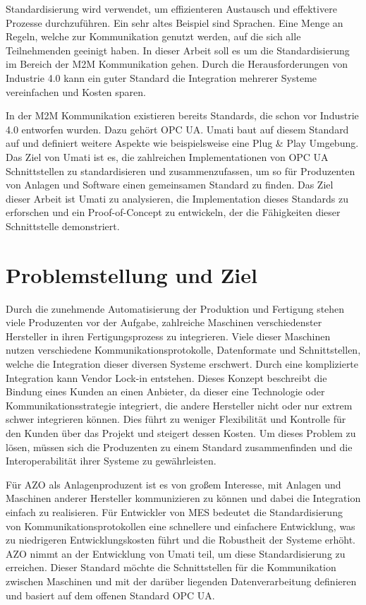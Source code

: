 \documentclass[a4paper, 12pt, oneside, toc=listofnumbered, bibliography=totoc]{scrbook}
\begin{document}
	Standardisierung wird verwendet, um effizienteren Austausch und effektivere Prozesse durchzuführen. Ein sehr altes Beispiel sind Sprachen. Eine Menge an Regeln, welche zur Kommunikation genutzt werden, auf die sich alle Teilnehmenden geeinigt haben. In dieser Arbeit soll es um die Standardisierung im Bereich der \ac{M2M} Kommunikation gehen. Durch die Herausforderungen von Industrie 4.0 kann ein guter Standard die Integration mehrerer Systeme vereinfachen und Kosten sparen.
	
	In der M2M Kommunikation existieren bereits Standards, die schon vor Industrie 4.0 entworfen wurden. Dazu gehört \ac{OPC UA}. \ac{Umati} baut auf diesem Standard auf und definiert weitere Aspekte wie beispielsweise eine Plug \& Play Umgebung. Das Ziel von \ac{Umati} ist es, die zahlreichen Implementationen von OPC UA Schnittstellen zu standardisieren und zusammenzufassen, um so für Produzenten von Anlagen und Software einen gemeinsamen Standard zu finden. Das Ziel dieser Arbeit ist \ac{Umati} zu analysieren, die Implementation dieses Standards zu erforschen und ein Proof-of-Concept zu entwickeln, der die Fähigkeiten dieser Schnittstelle demonstriert.
	
	\section{Problemstellung und Ziel}
	
	
	 Durch die zunehmende Automatisierung der Produktion und Fertigung stehen viele Produzenten vor der Aufgabe, zahlreiche Maschinen verschiedenster Hersteller in ihren Fertigungsprozess zu integrieren. Viele dieser Maschinen nutzen verschiedene Kommunikationsprotokolle, Datenformate und Schnittstellen, welche die Integration dieser diversen Systeme erschwert. Durch eine komplizierte Integration kann Vendor Lock-in entstehen. Dieses Konzept beschreibt die Bindung eines Kunden an einen Anbieter, da dieser eine Technologie oder Kommunikationsstrategie integriert, die andere Hersteller nicht oder nur extrem schwer integrieren können. Dies führt zu weniger Flexibilität und Kontrolle für den Kunden über das Projekt und steigert dessen Kosten. Um dieses Problem zu lösen, müssen sich die Produzenten zu einem Standard zusammenfinden und die Interoperabilität ihrer Systeme zu gewährleisten. \cite{mielebacher_verteilte_2021}
	 
	 Für AZO als Anlagenproduzent ist es von großem Interesse, mit Anlagen und Maschinen anderer Hersteller kommunizieren zu können und dabei die Integration einfach zu realisieren. Für Entwickler von \ac{MES} bedeutet die Standardisierung von Kommunikationsprotokollen eine schnellere und einfachere Entwicklung, was zu niedrigeren Entwicklungskosten führt und die Robustheit der Systeme erhöht. AZO nimmt an der Entwicklung von \ac{Umati} teil, um diese Standardisierung zu erreichen. Dieser Standard möchte die Schnittstellen für die Kommunikation zwischen Maschinen und mit der darüber liegenden Datenverarbeitung definieren und basiert auf dem offenen Standard \ac{OPC UA}.
	 
\end{document}
